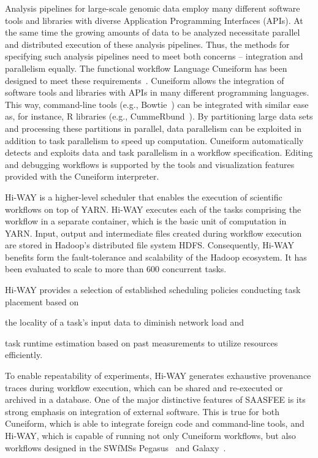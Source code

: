 Analysis pipelines for large-scale genomic data employ many different software tools and libraries with diverse Application Programming Interfaces (APIs). At the same time the growing amounts of data to be analyzed necessitate parallel and distributed execution of these analysis pipelines. Thus, the methods for specifying such analysis pipelines need to meet both concerns -- integration and parallelism equally. The functional workflow Language Cuneiform has been designed to meet these requirements~\cite{Brandt2015}. Cuneiform allows the integration of software tools and libraries with APIs in many different programming languages. This way, command-line tools (e.g., Bowtie~\cite{langmead2009ultrafast}) can be integrated with similar ease as, for instance, R libraries (e.g., CummeRbund~\cite{goff2012cummerbund}). By partitioning large data sets and processing these partitions in parallel, data parallelism can be exploited in addition to task parallelism to speed up computation. Cuneiform automatically detects and exploits data and task parallelism in a workflow specification. Editing and debugging workflows is supported by the tools and visualization features provided with the Cuneiform interpreter.

Hi-WAY is a higher-level scheduler that enables the execution of scientific workflows on top of YARN. Hi-WAY executes each of the tasks comprising the workflow in a separate container, which is the basic unit of computation in YARN. Input, output and intermediate files created during workflow execution are stored in Hadoop's distributed file system HDFS. Consequently, Hi-WAY benefits form the fault-tolerance and scalability of the Hadoop ecosystem. It has been evaluated to scale to more than 600 concurrent tasks.

Hi-WAY provides a selection of established scheduling policies conducting task placement based on
\begin{inparaenum}[(a)]
  \item the locality of a task's input data to diminish network load and
  \item task runtime estimation based on past measurements to utilize resources efficiently.
\end{inparaenum}
To enable repeatability of experiments, Hi-WAY generates exhaustive provenance traces during workflow execution, which can be shared and re-executed or archived in a database. One of the major distinctive features of SAASFEE is its strong emphasis on integration of external software. This is true for both Cuneiform, which is able to integrate foreign code and command-line tools, and Hi-WAY, which is capable of running not only Cuneiform workflows, but also workflows designed in the SWfMSs Pegasus~\cite{pegasus_fgcs} and Galaxy~\cite{Goecks10}.


